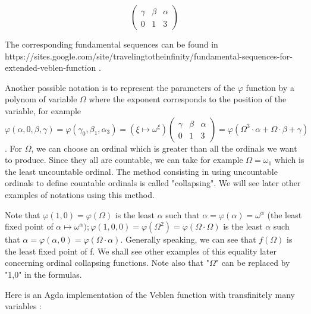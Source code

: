 \documentclass[10pt]{article}
\begin{document}
\[
  \begin{pmatrix}
    \gamma & \beta & \alpha \\
    0 & 1 & 3
  \end{pmatrix}
\]

The corresponding fundamental sequences can be found in https://sites.google.com/site/travelingtotheinfinity/fundamental-sequences-for-extended-veblen-function .

\bigskip

Another possible notation is to represent the parameters of the \( \varphi \) function by a polynom of variable \( \Omega \) where the exponent corresponds to the position of the variable, for example \( \varphi(\alpha,0,\beta,\gamma) = \varphi(\gamma_0,\beta_1,\alpha_3) = (\xi \mapsto \omega^\xi) \begin{pmatrix} \gamma & \beta & \alpha \\ 0 & 1 & 3 \end{pmatrix} = \varphi(\Omega^3 \cdot \alpha + \Omega \cdot \beta + \gamma) \). For \( \Omega \), we can choose an ordinal which is greater than all the ordinals we want to produce. Since they all are countable, we can take for example \( \Omega = \omega_1 \) which is the least uncountable ordinal. The method consisting in using uncountable ordinals to define countable ordinals is called "collapsing". We will see later other examples of notations using this method.

Note that \( \varphi(1,0) = \varphi(\Omega) \) is the least \( \alpha \) such that \( \alpha = \varphi(\alpha) = \omega^\alpha \) (the least fixed point of \( \alpha \mapsto \omega^\alpha) ; \varphi(1,0,0) = \varphi(\Omega^2) = \varphi(\Omega \cdot \Omega) \) is the least \( \alpha \) such that \( \alpha = \varphi(\alpha,0) = \varphi(\Omega \cdot \alpha) \). Generally speaking, we can see that \( f(\Omega) \) is the least fixed point of f. We shall see other examples of this equality later concerning ordinal collapsing functions. Note also that "\(\Omega\)" can be replaced by "1,0" in the formulas.

\bigskip

Here is an Agda implementation of the Veblen function with transfinitely many variables :
\end{document}
